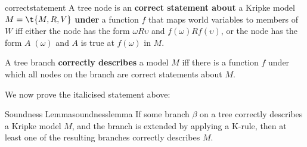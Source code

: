 \begin{definition}{}{correctstatement}
  A tree node is an \textbf{correct statement about} a Kripke model
  $M = \t{M,R,V}$ \textbf{under} a function $f$ that maps world variables to
  members of $W$ iff either the node has the form $\omega R \upsilon$ and
  $f(\omega)Rf(\upsilon)$, or the node has the form $A\; (\omega)$ and $A$ is
  true at $f(\omega)$ in $M$.

  A tree branch \textbf{correctly describes} a model $M$ iff there is a function
  $f$ under which all nodes on the branch are correct statements about $M$.
\end{definition}


We now prove the italicised statement above:

\begin{theorem}{Soundness Lemma}{soundnesslemma}
  If some branch $\beta$ on a tree correctly describes a Kripke model $M$, and
  the branch is extended by applying a K-rule, then at least one of the
  resulting branches correctly describes $M$.
\end{theorem}

